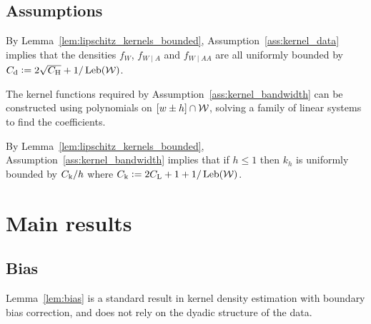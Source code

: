 \subsection{Assumptions}
\label{sec:assumptions}

\begin{remark}
  By Lemma~\ref{lem:lipschitz_kernels_bounded},
  Assumption~\ref{ass:kernel_data} implies that the densities
  $f_W$, $f_{W \mid A}$ and $f_{W \mid AA}$ are all uniformly bounded by
  $C_\mathrm{d} \vcentcolon= 2 \sqrt{C_\mathrm{H}} + 1/\operatorname{Leb}(\mathcal{W})$.
\end{remark}

\begin{remark}
  The kernel functions required by
  Assumption~\ref{ass:kernel_bandwidth}
  can be constructed using
  polynomials on $[w \pm h] \cap \mathcal{W}$,
  solving a family of linear systems to find the coefficients.
\end{remark}

\begin{remark}
  By Lemma~\ref{lem:lipschitz_kernels_bounded},
  Assumption~\ref{ass:kernel_bandwidth} implies that
  if $h \leq 1$ then
  $k_h$ is uniformly bounded by
  $C_\mathrm{k} / h$ where $C_\mathrm{k} \vcentcolon = 2 C_\mathrm{L} + 1 + 1/\operatorname{Leb}(\mathcal{W})$.
\end{remark}
\section{Main results}

\subsection{Bias}

Lemma~\ref{lem:bias}
is a standard result in kernel density estimation
with boundary bias correction,
and does not rely on the dyadic structure of the data.

